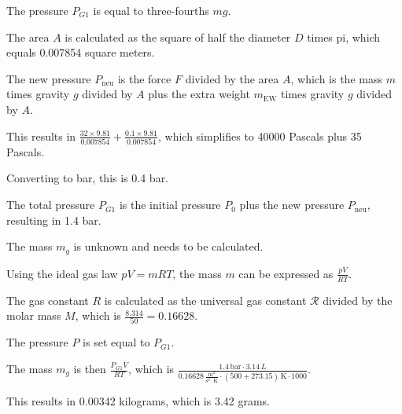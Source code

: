 The pressure \( P_{G1} \) is equal to three-fourths \( mg \).

The area \( A \) is calculated as the square of half the diameter \( D \) times pi, which equals 0.007854 square meters.

The new pressure \( P_{\text{neu}} \) is the force \( F \) divided by the area \( A \), which is the mass \( m \) times gravity \( g \) divided by \( A \) plus the extra weight \( m_{\text{EW}} \) times gravity \( g \) divided by \( A \).

This results in \( \frac{32 \times 9.81}{0.007854} + \frac{0.1 \times 9.81}{0.007854} \), which simplifies to 40000 Pascals plus 35 Pascals.

Converting to bar, this is 0.4 bar.

The total pressure \( P_{G1} \) is the initial pressure \( P_0 \) plus the new pressure \( P_{\text{neu}} \), resulting in 1.4 bar.

The mass \( m_g \) is unknown and needs to be calculated.

Using the ideal gas law \( pV = mRT \), the mass \( m \) can be expressed as \( \frac{pV}{RT} \).

The gas constant \( R \) is calculated as the universal gas constant \( \mathcal{R} \) divided by the molar mass \( M \), which is \( \frac{8.314}{50} = 0.16628 \).

The pressure \( P \) is set equal to \( P_{G1} \).

The mass \( m_g \) is then \( \frac{P_{G1} V}{RT} \), which is \( \frac{1.4 \, \text{bar} \cdot 3.14 \, L}{0.16628 \, \frac{\text{m}^2}{\text{s}^2 \cdot \text{K}} \cdot (500 + 273.15) \, \text{K} \cdot 1000} \).

This results in 0.00342 kilograms, which is 3.42 grams.